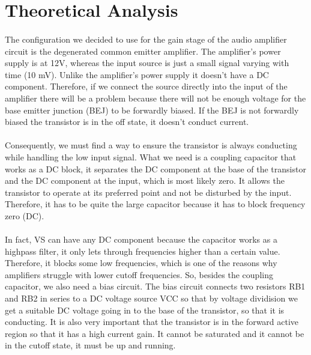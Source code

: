 \section{Theoretical Analysis}  \label{sec:analysis}

\paragraph{} The configuration we decided to use for the gain stage of the audio amplifier circuit is the
degenerated common emitter amplifier. The amplifier's power supply is at 12V, whereas the
input source is just a small signal varying with time (10 mV). Unlike the amplifier's power supply
it doesn't have a DC component. Therefore, if we connect the source directly into the
input of the amplifier there will be a problem because there will not be enough voltage
for the base emitter junction (BEJ) to be forwardly biased. If the BEJ is not forwardly
biased the transistor is in the off state, it doesn't conduct current.
\paragraph{} Consequently, we must find a way to ensure the transistor is always conducting while handling the low
input signal. What we need is a coupling capacitor that works as a DC block, it separates the DC
component at the base of the transistor and the DC component at the input, which is
most likely zero. It allows the transistor to operate at its preferred point and not be
disturbed by the input. Therefore, it has to be quite the large capacitor because it has
to block frequency zero (DC).
\paragraph{} In fact, VS can have any DC component because the capacitor
works as a highpass filter, it only lets through frequencies higher than a certain value.
Therefore, it blocks some low frequencies, which is
one of the reasons why amplifiers struggle with lower cutoff frequencies. So, besides the
coupling capacitor, we also need a bias circuit. The bias circuit connects two resistors
RB1 and RB2 in series to a DC voltage source VCC so that by voltage dividision we get
a suitable DC voltage
going in to the base of the transistor, so that it is conducting. It is also very important
that the transistor is in the forward active region so that it has a high current gain.
It cannot be saturated and it cannot be in the cutoff state, it must be up and running.

